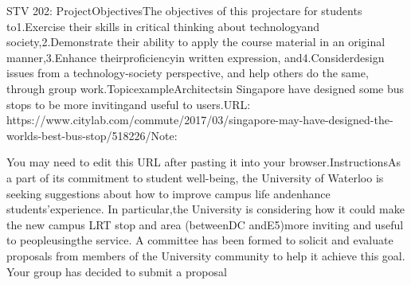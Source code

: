 \documentclass{article}
\begin{document}
STV 202: ProjectObjectivesThe objectives of this projectare for students to1.Exercise their skills in critical thinking about technologyand society,2.Demonstrate their ability to apply the course material in an original manner,3.Enhance theirproficiencyin written expression, and4.Considerdesign issues from a technology-society perspective, and help others do the same, through group work.TopicexampleArchitectsin Singapore have designed some bus stops to be more invitingand useful to users.URL: https://www.citylab.com/commute/2017/03/singapore-may-have-designed-the-worlds-best-bus-stop/518226/Note:

You may need to edit this URL after pasting it into your browser.InstructionsAs a part of its commitment to student well-being, the University of Waterloo is seeking suggestions about how to improve campus life andenhance students’experience.  In particular,the University is considering how it could make the new campus LRT stop and area (betweenDC andE5)more inviting and useful to peopleusingthe service.  A committee has been formed to solicit and evaluate proposals from members of the University community to help it achieve this goal.  Your group has decided to submit a proposal
\end{document}
